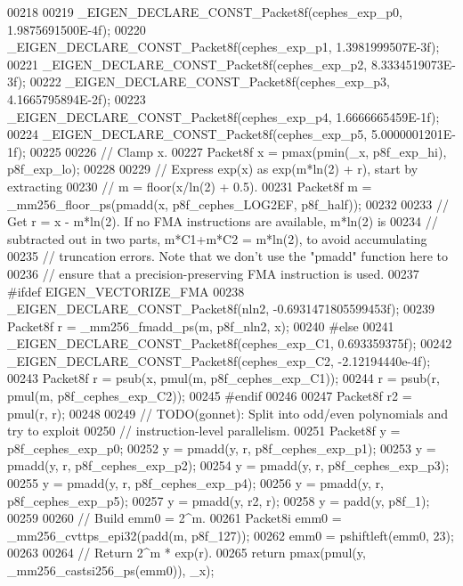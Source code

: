 \begin{DoxyCode}
00218 
00219   \_EIGEN\_DECLARE\_CONST\_Packet8f(cephes\_exp\_p0, 1.9875691500E-4f);
00220   \_EIGEN\_DECLARE\_CONST\_Packet8f(cephes\_exp\_p1, 1.3981999507E-3f);
00221   \_EIGEN\_DECLARE\_CONST\_Packet8f(cephes\_exp\_p2, 8.3334519073E-3f);
00222   \_EIGEN\_DECLARE\_CONST\_Packet8f(cephes\_exp\_p3, 4.1665795894E-2f);
00223   \_EIGEN\_DECLARE\_CONST\_Packet8f(cephes\_exp\_p4, 1.6666665459E-1f);
00224   \_EIGEN\_DECLARE\_CONST\_Packet8f(cephes\_exp\_p5, 5.0000001201E-1f);
00225 
00226   \textcolor{comment}{// Clamp x.}
00227   Packet8f x = pmax(pmin(\_x, p8f\_exp\_hi), p8f\_exp\_lo);
00228 
00229   \textcolor{comment}{// Express exp(x) as exp(m*ln(2) + r), start by extracting}
00230   \textcolor{comment}{// m = floor(x/ln(2) + 0.5).}
00231   Packet8f m = \_mm256\_floor\_ps(pmadd(x, p8f\_cephes\_LOG2EF, p8f\_half));
00232 
00233 \textcolor{comment}{// Get r = x - m*ln(2). If no FMA instructions are available, m*ln(2) is}
00234 \textcolor{comment}{// subtracted out in two parts, m*C1+m*C2 = m*ln(2), to avoid accumulating}
00235 \textcolor{comment}{// truncation errors. Note that we don't use the "pmadd" function here to}
00236 \textcolor{comment}{// ensure that a precision-preserving FMA instruction is used.}
00237 \textcolor{preprocessor}{#ifdef EIGEN\_VECTORIZE\_FMA}
00238   \_EIGEN\_DECLARE\_CONST\_Packet8f(nln2, -0.6931471805599453f);
00239   Packet8f r = \_mm256\_fmadd\_ps(m, p8f\_nln2, x);
00240 \textcolor{preprocessor}{#else}
00241   \_EIGEN\_DECLARE\_CONST\_Packet8f(cephes\_exp\_C1, 0.693359375f);
00242   \_EIGEN\_DECLARE\_CONST\_Packet8f(cephes\_exp\_C2, -2.12194440e-4f);
00243   Packet8f r = psub(x, pmul(m, p8f\_cephes\_exp\_C1));
00244   r = psub(r, pmul(m, p8f\_cephes\_exp\_C2));
00245 \textcolor{preprocessor}{#endif}
00246 
00247   Packet8f r2 = pmul(r, r);
00248 
00249   \textcolor{comment}{// TODO(gonnet): Split into odd/even polynomials and try to exploit}
00250   \textcolor{comment}{//               instruction-level parallelism.}
00251   Packet8f y = p8f\_cephes\_exp\_p0;
00252   y = pmadd(y, r, p8f\_cephes\_exp\_p1);
00253   y = pmadd(y, r, p8f\_cephes\_exp\_p2);
00254   y = pmadd(y, r, p8f\_cephes\_exp\_p3);
00255   y = pmadd(y, r, p8f\_cephes\_exp\_p4);
00256   y = pmadd(y, r, p8f\_cephes\_exp\_p5);
00257   y = pmadd(y, r2, r);
00258   y = padd(y, p8f\_1);
00259 
00260   \textcolor{comment}{// Build emm0 = 2^m.}
00261   Packet8i emm0 = \_mm256\_cvttps\_epi32(padd(m, p8f\_127));
00262   emm0 = pshiftleft(emm0, 23);
00263 
00264   \textcolor{comment}{// Return 2^m * exp(r).}
00265   \textcolor{keywordflow}{return} pmax(pmul(y, \_mm256\_castsi256\_ps(emm0)), \_x);

\end{DoxyCode}
